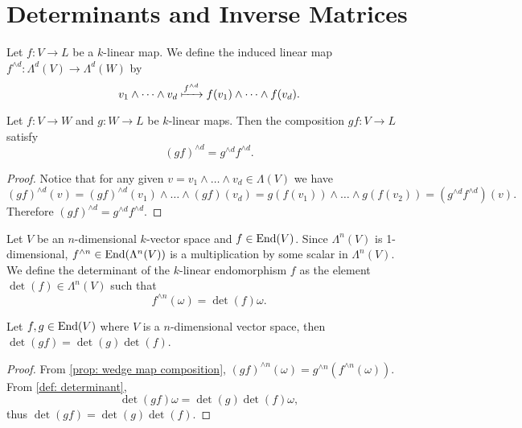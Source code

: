 \section{Determinants and Inverse Matrices}

\begin{definition}\label{def: wedge map}
  Let \(f: V \to L\) be a \(k\)-linear map. We define the induced linear map
  \(f^{\wedge d}: \Lambda^d(V) \to \Lambda^d(W)\) by
  \[
    v_1 \wedge \dots \wedge v_d \xmapsto{f^{\wedge d}}
    f(v_1) \wedge \dots \wedge f(v_d).
  \]
\end{definition}

\begin{proposition}\label{prop: wedge map composition}
  Let \(f: V \to W\) and \(g: W \to L\) be \(k\)-linear maps. Then the
  composition \(g f: V \to L\) satisfy
  \[
    (g f)^{\wedge d} = g^{\wedge d} f^{\wedge d}.
  \]
\end{proposition}

\begin{proof}
  Notice that for any given \(v = v_1 \wedge \dots \wedge v_d \in \Lambda(V)\)
  we have
  \[
    (g f)^{\wedge d}(v) = (g f)^{\wedge d}(v_1) \wedge \dots \wedge (g f)(v_d)
    = g(f(v_1)) \wedge \dots \wedge g(f(v_2))
    = (g^{\wedge d} f^{\wedge d})(v).
  \]
  Therefore \((g f)^{\wedge d} = g^{\wedge d} f^{\wedge d}\).
\end{proof}

\begin{definition}[Determinant]\label{def: determinant}
  Let \(V\) be an \(n\)-dimensional \(k\)-vector space and \(f \in \operatorname{End}(V)\).
  Since \(\Lambda^n(V)\) is 1-dimensional, \(f^{\wedge n} \in \operatorname{End}(\Lambda^n
  (V))\) is a multiplication by some scalar in \(\Lambda^n(V)\).  We define the
  determinant of the \(k\)-linear endomorphism \(f\) as the element \(\det(f)
  \in \Lambda^n(V)\) such that
  \[
    f^{\wedge n}(\omega) = \det(f) \omega.
  \]
\end{definition}

\begin{proposition}\label{prop: comp det}
  Let \(f, g \in \operatorname{End}(V)\) where \(V\) is a \(n\)-dimensional vector space, then
  \(\det(g f) = \det(g) \det(f)\).
\end{proposition}

\begin{proof}
  From \cref{prop: wedge map composition}, \((g f)^{\wedge n}(\omega) =
  g^{\wedge n}(f^{\wedge n}(\omega))\). From \cref{def: determinant},
  \[
    \det(g f) \omega = \det(g) \det(f) \omega,
  \]
  thus \(\det(g f) = \det(g) \det(f)\).
\end{proof}


